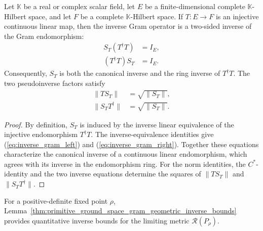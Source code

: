 \begin{lemma}
    \label{thm:inverse_gram_identities}
    \leanok
    Let $\mathbb K$ be a real or complex scalar field, let $E$ be a
    finite-dimensional complete $\mathbb K$-Hilbert space, and let $F$ be a
    complete $\mathbb K$-Hilbert space.  If $T\colon E\to F$ is an injective
    continuous linear map, then the inverse Gram operator is a two-sided
    inverse of the Gram endomorphism:
    \begin{align}
        S_T(T^\dagger T) & =I_E,
        \label{eq:inverse_gram_left} \\
        (T^\dagger T)S_T & =I_E.
        \label{eq:inverse_gram_right}
    \end{align}
    Consequently, $S_T$ is both the canonical inverse and the ring inverse of
    $T^\dagger T$.  The two pseudoinverse factors satisfy
    \begin{align}
        \lVert TS_T\rVert         & =\sqrt{\lVert S_T\rVert}, \\
        \lVert S_TT^\dagger\rVert & =\sqrt{\lVert S_T\rVert}.
    \end{align}
\end{lemma}

\begin{proof}
    \leanok
    By definition, $S_T$ is induced by the inverse linear equivalence of the
    injective endomorphism $T^\dagger T$.  The inverse-equivalence identities
    give (\ref{eq:inverse_gram_left}) and
    (\ref{eq:inverse_gram_right}).  Together these equations characterize the
    canonical inverse of a continuous linear endomorphism, which agrees with
    its inverse in the endomorphism ring.  For the norm identities, the
    $C^*$-identity and the two inverse equations determine the squares of
    $\lVert TS_T\rVert$ and $\lVert S_TT^\dagger\rVert$.
\end{proof}

For a positive-definite fixed point $\rho$,
Lemma~\ref{thm:primitive_ground_space_gram_geometric_inverse_bounds} provides
quantitative inverse bounds for the limiting metric $\mathscr R(P_\rho)$.

